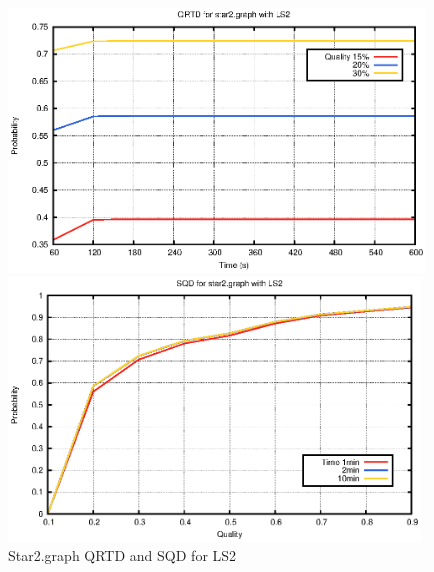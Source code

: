 \begin{figure}[H]
\centering
\caption{Star2.graph QRTD and SQD for LS2}
\begin{minipage}[b]{0.4\textwidth}
\includegraphics[height=7cm]{../graph/star2-QRTD-LS2.eps}
\end{minipage}
\hspace{0.6in}
\begin{minipage}[b]{0.4\textwidth}
\centering
\includegraphics[height=7cm]{../graph/star2-SQD-LS2.eps}
\end{minipage}
\end{figure}

